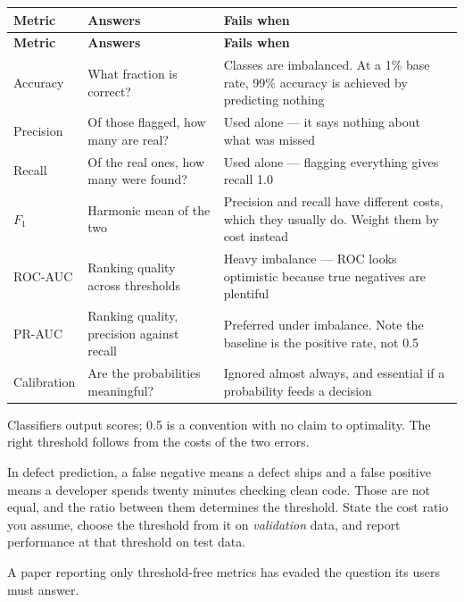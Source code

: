 \begin{center}
\small
\begin{longtable}{@{}L{3.0cm}L{4.6cm}L{6.6cm}@{}}
\toprule
\textbf{Metric} & \textbf{Answers} & \textbf{Fails when} \\
\midrule
\endfirsthead
\toprule
\textbf{Metric} & \textbf{Answers} & \textbf{Fails when} \\
\midrule
\endhead
\bottomrule
\endfoot
Accuracy
  & What fraction is correct?
  & Classes are imbalanced. At a 1\% base rate, 99\% accuracy is achieved by
    predicting nothing \\
Precision
  & Of those flagged, how many are real?
  & Used alone --- it says nothing about what was missed \\
Recall
  & Of the real ones, how many were found?
  & Used alone --- flagging everything gives recall 1.0 \\
$F_1$
  & Harmonic mean of the two
  & Precision and recall have different costs, which they usually do.
    Weight them by cost instead \\
ROC-AUC
  & Ranking quality across thresholds
  & Heavy imbalance --- ROC looks optimistic because true negatives are
    plentiful~\cite{saito2015precision} \\
PR-AUC
  & Ranking quality, precision against recall
  & Preferred under imbalance. Note the baseline is the positive rate, not 0.5 \\
Calibration
  & Are the probabilities meaningful?
  & Ignored almost always, and essential if a probability feeds a decision \\
\end{longtable}
\end{center}

\begin{conceptbox}
Classifiers output scores; 0.5 is a convention with no claim to optimality. The
right threshold follows from the costs of the two errors.

\medskip
In defect prediction, a false negative means a defect ships and a false
positive means a developer spends twenty minutes checking clean code. Those are
not equal, and the ratio between them determines the threshold. State the cost
ratio you assume, choose the threshold from it on \emph{validation} data, and
report performance at that threshold on test data.

\medskip
A paper reporting only threshold-free metrics has evaded the question its users
must answer.
\end{conceptbox}

